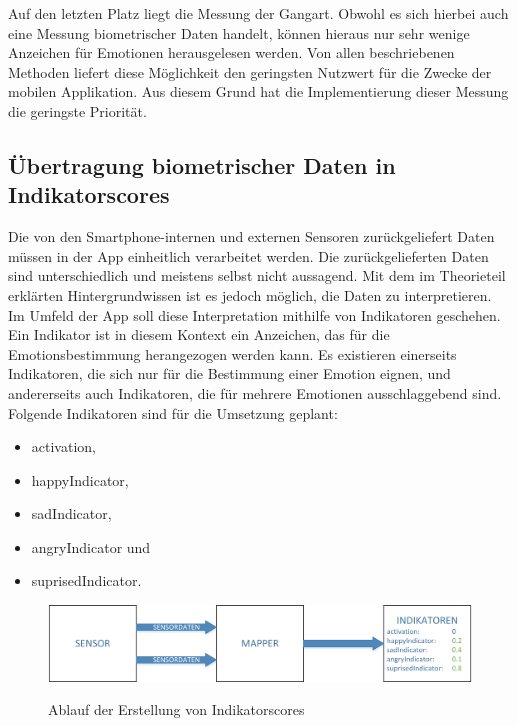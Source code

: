 Auf den letzten Platz liegt die Messung der Gangart. Obwohl es sich hierbei auch eine Messung biometrischer Daten handelt, können hieraus nur sehr wenige Anzeichen für Emotionen herausgelesen werden. Von allen beschriebenen Methoden liefert diese Möglichkeit den geringsten Nutzwert für die Zwecke der mobilen Applikation. Aus diesem Grund hat die Implementierung dieser Messung die geringste Priorität. \newline
\subsection{Übertragung biometrischer Daten in Indikatorscores}
Die von den Smartphone-internen und externen Sensoren zurückgeliefert Daten müssen in der App einheitlich verarbeitet werden. Die zurückgelieferten Daten sind unterschiedlich und meistens selbst nicht aussagend. Mit dem im Theorieteil erklärten Hintergrundwissen ist es jedoch möglich, die Daten zu interpretieren. \newline 
Im Umfeld der App soll diese Interpretation mithilfe von Indikatoren geschehen. Ein Indikator ist in diesem Kontext ein Anzeichen, das für die Emotionsbestimmung herangezogen werden kann. Es existieren einerseits Indikatoren, die sich nur für die Bestimmung einer Emotion eignen, und andererseits auch Indikatoren, die für mehrere Emotionen ausschlaggebend sind. Folgende Indikatoren sind für die Umsetzung geplant: 
\begin{itemize}[noitemsep, topsep=0pt]
	\item activation,
	\item happyIndicator,
	\item sadIndicator,
    \item angryIndicator und
    \item suprisedIndicator.
\end{itemize}
\begin{figure}[h]
	\centering
	\includegraphics[width=16cm]{Bilder/indicatorscore.png}
	\label{img:Ablauf Erstellung Indicatorscores}
	\caption[Ablauf der Erstellung von Indikatorscores]{Ablauf der Erstellung von Indikatorscores}
\end{figure}%
